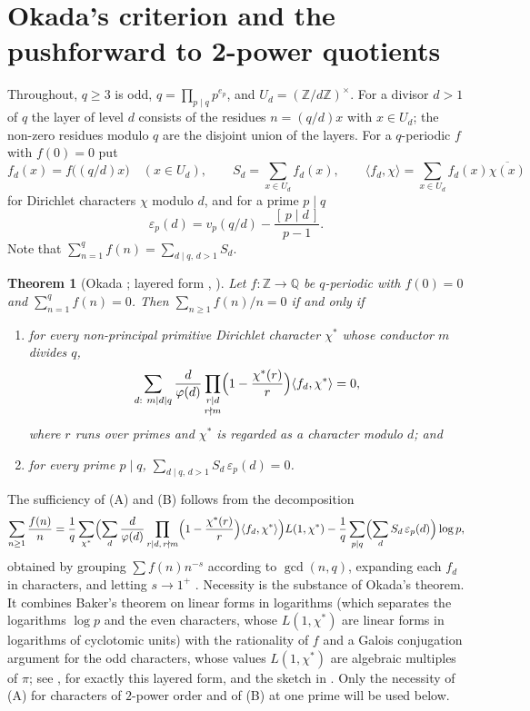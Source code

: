 \documentclass[11pt]{amsart}
\newtheorem{theorem}{Theorem}[section]
\theoremstyle{definition}
\theoremstyle{remark}
\providecommand{\Q}{\mathbb Q}
\providecommand{\Z}{\mathbb Z}
\newcommand{\ip}[2]{\langle #1,#2\rangle}
\numberwithin{equation}{section}
\begin{document}
\section{Okada's criterion and the pushforward to 2-power quotients}\label{sec:shadow}

Throughout, $q\ge3$ is odd, $q=\prod_{p\mid q}p^{e_p}$, and $U_d=(\Z/d\Z)^\times$.
For a divisor $d>1$ of $q$ the layer of level $d$ consists of the residues $n=(q/d)x$ with $x\in U_d$; the non-zero residues modulo $q$ are the disjoint union of the layers.
For a $q$-periodic $f$ with $f(0)=0$ put
\[
f_d(x)=f\bigl((q/d)x\bigr)\quad(x\in U_d),\qquad S_d=\sum_{x\in U_d}f_d(x),\qquad \ip{f_d}{\chi}=\sum_{x\in U_d}f_d(x)\overline{\chi(x)}
\]
for Dirichlet characters $\chi$ modulo $d$, and for a prime $p\mid q$
\[
\varepsilon_p(d)=v_p(q/d)-\frac{[\,p\mid d\,]}{p-1}.
\]
Note that $\sum_{n=1}^qf(n)=\sum_{d\mid q,\,d>1}S_d$.

\begin{theorem}[Okada \cite{Oka82}; layered form \cite{Bha22}, {\cite[Prop.~2.1, Thm.~2.2]{Kei26}}]\label{thm:okada}
Let $f\colon\Z\to\Q$ be $q$-periodic with $f(0)=0$ and $\sum_{n=1}^{q}f(n)=0$.
Then $\sum_{n\ge1}f(n)/n=0$ if and only if
\begin{enumerate}
\item[(A)] for every non-principal primitive Dirichlet character $\chi^*$ whose conductor $m$ divides $q$,
\[
\sum_{d:\ m\mid d\mid q}\frac{d}{\varphi(d)}\prod_{\substack{r\mid d\\ r\nmid m}}\Bigl(1-\frac{\chi^*(r)}{r}\Bigr)\ip{f_d}{\chi^*}=0,
\]
where $r$ runs over primes and $\chi^*$ is regarded as a character modulo $d$; and
\item[(B)] for every prime $p\mid q$, $\sum_{d\mid q,\,d>1}S_d\,\varepsilon_p(d)=0$.
\end{enumerate}
\end{theorem}

The sufficiency of (A) and (B) follows from the decomposition
\begin{equation}\label{eq:decomp}
\sum_{n\ge1}\frac{f(n)}n=\frac1q\sum_{\chi^*}\Bigl(\sum_{d}\frac{d}{\varphi(d)}\prod_{r\mid d,\,r\nmid m}\Bigl(1-\frac{\chi^*(r)}{r}\Bigr)\ip{f_d}{\chi^*}\Bigr)L(1,\chi^*)-\frac1q\sum_{p\mid q}\Bigl(\sum_dS_d\,\varepsilon_p(d)\Bigr)\log p,
\end{equation}
obtained by grouping $\sum f(n)n^{-s}$ according to $\gcd(n,q)$, expanding each $f_d$ in characters, and letting $s\to1^+$ \cite[Prop.~2.1]{Kei26}.
Necessity is the substance of Okada's theorem.
It combines Baker's theorem on linear forms in logarithms (which separates the logarithms $\log p$ and the even characters, whose $L(1,\chi^*)$ are linear forms in logarithms of cyclotomic units) with the rationality of $f$ and a Galois conjugation argument for the odd characters, whose values $L(1,\chi^*)$ are algebraic multiples of $\pi$; see \cite{BBW73,Oka82}, \cite[Thm.~4]{Bha22} for exactly this layered form, and the sketch in \cite[proof of Thm.~2.2]{Kei26}.
Only the necessity of (A) for characters of $2$-power order and of (B) at one prime will be used below.
\end{document}
